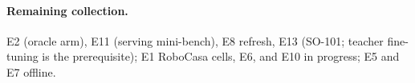 \documentclass{article}
\begin{document}
\paragraph{Remaining collection.}
E2 (oracle arm), E11 (serving mini-bench), E8 refresh, E13 (SO-101; teacher
fine-tuning is the prerequisite); E1 RoboCasa cells, E6, and E10 in progress;
E5 and E7 offline.
\end{document}
